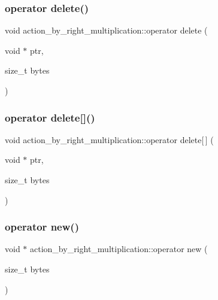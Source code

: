 \subsubsection{\texorpdfstring{operator delete()}{operator delete()}}
{\footnotesize\ttfamily void action\+\_\+by\+\_\+right\+\_\+multiplication\+::operator delete (\begin{DoxyParamCaption}\item[{void $\ast$}]{ptr,  }\item[{size\+\_\+t}]{bytes }\end{DoxyParamCaption})}

\mbox{\label{classaction__by__right__multiplication_a26d610c6cd269cdb404bf2ca4e45f70f}} 
\subsubsection{\texorpdfstring{operator delete[]()}{operator delete[]()}}
{\footnotesize\ttfamily void action\+\_\+by\+\_\+right\+\_\+multiplication\+::operator delete\mbox{[}$\,$\mbox{]} (\begin{DoxyParamCaption}\item[{void $\ast$}]{ptr,  }\item[{size\+\_\+t}]{bytes }\end{DoxyParamCaption})}

\mbox{\label{classaction__by__right__multiplication_a25a64e7959c984ea011db8987d55ef4a}} 
\subsubsection{\texorpdfstring{operator new()}{operator new()}}
{\footnotesize\ttfamily void $\ast$ action\+\_\+by\+\_\+right\+\_\+multiplication\+::operator new (\begin{DoxyParamCaption}\item[{size\+\_\+t}]{bytes }\end{DoxyParamCaption})}

